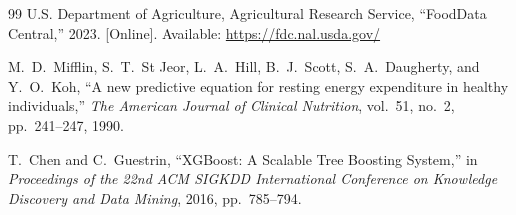 \documentclass[12pt,a4paper]{report}
\begin{document}
\begin{thebibliography}{99}
U.S. Department of Agriculture, Agricultural Research Service,
``FoodData Central,''
2023. [Online]. Available: \url{https://fdc.nal.usda.gov/}

M.~D.~Mifflin, S.~T.~St Jeor, L.~A.~Hill, B.~J.~Scott, S.~A.~Daugherty, and Y.~O.~Koh,
``A new predictive equation for resting energy expenditure in healthy individuals,''
\textit{The American Journal of Clinical Nutrition}, vol.~51, no.~2, pp.~241--247, 1990.

T.~Chen and C.~Guestrin,
``XGBoost: A Scalable Tree Boosting System,''
in \textit{Proceedings of the 22nd ACM SIGKDD International Conference on Knowledge Discovery and Data Mining}, 2016, pp.~785--794.

\end{thebibliography}
\end{document}
